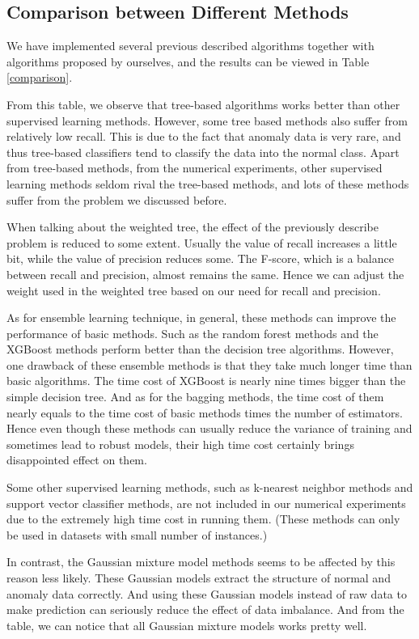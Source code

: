 \documentclass[english]{article}
\begin{document}
\subsection{Comparison between Different Methods}
\par We have implemented several previous described algorithms together with algorithms proposed by ourselves, and the results can be viewed in Table \ref{comparison}.
\par From this table, we observe that tree-based algorithms works better than other supervised learning methods. However, some tree based methods also suffer from relatively low recall. This is due to the fact that anomaly data is very rare, and thus tree-based classifiers tend to classify the data into the normal class. Apart from tree-based methods, from the numerical experiments, other supervised learning methods seldom rival the tree-based methods, and lots of these methods suffer from the problem we discussed before.
\par When talking about the weighted tree, the effect of the previously describe problem is reduced to some extent. Usually the value of recall increases a little bit, while the value of precision reduces some. The F-score, which is a balance between recall and precision, almost remains the same. Hence we can adjust the weight used in the weighted tree based on our need for recall and precision.
\par As for ensemble learning technique, in general, these methods can improve the performance of basic methods. Such as the random forest methods and the XGBoost methods perform better than the decision tree algorithms. However, one drawback of these ensemble methods is that they take much longer time than basic algorithms. The time cost of XGBoost is nearly nine times bigger than the simple decision tree. And as for the bagging methods, the time cost of them nearly equals to the time cost of basic methods times the number of estimators. Hence even though these methods can usually reduce the variance of training and sometimes lead to robust models, their high time cost certainly brings disappointed effect on them.
\par Some other supervised learning methods, such as k-nearest neighbor methods and support vector classifier methods, are not included in our numerical experiments due to the extremely high time cost in running them. (These methods can only be used in datasets with small number of instances.)
\par In contrast, the Gaussian mixture model methods seems to be affected by this reason less likely. These Gaussian models extract the structure of normal and anomaly data correctly. And using these Gaussian models instead of raw data to make prediction can seriously reduce the effect of data imbalance. And from the table, we can notice that all Gaussian mixture models works pretty well.
\end{document}
